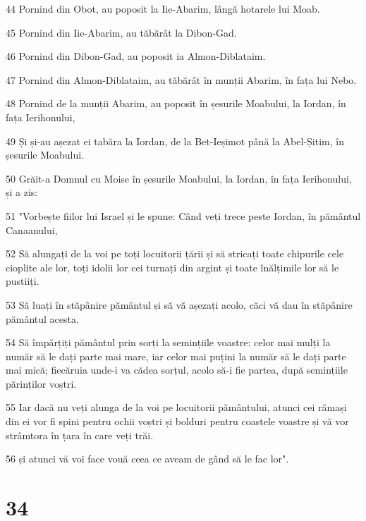 \par 44 Pornind din Obot, au poposit la Iie-Abarim, lângă hotarele lui Moab.
\par 45 Pornind din Iie-Abarim, au tăbărât la Dibon-Gad.
\par 46 Pornind din Dibon-Gad, au poposit ia Almon-Diblataim.
\par 47 Pornind din Almon-Diblataim, au tăbărât în munții Abarim, în fața lui Nebo.
\par 48 Pornind de la munții Abarim, au poposit în șesurile Moabului, la Iordan, în fața Ierihonului,
\par 49 Și și-au așezat ei tabăra la Iordan, de la Bet-Ieșimot până la Abel-Șitim, în șesurile Moabului.
\par 50 Grăit-a Domnul cu Moise în șesurile Moabului, la Iordan, în fața Ierihonului, și a zis:
\par 51 "Vorbește fiilor lui Israel și le spune: Când veți trece peste Iordan, în pământul Canaanului,
\par 52 Să alungați de la voi pe toți locuitorii țării și să stricați toate chipurile cele cioplite ale lor, toți idolii lor cei turnați din argint și toate înălțimile lor să le pustiiți.
\par 53 Să luați în stăpânire pământul și să vă așezați acolo, căci vă dau în stăpânire pământul acesta.
\par 54 Să împărțiți pământul prin sorți la semințiile voastre: celor mai mulți la număr să le dați parte mai mare, iar celor mai puțini la număr să le dați parte mai mică; fiecăruia unde-i va cădea sorțul, acolo să-i fie partea, după semințiile părinților voștri.
\par 55 Iar dacă nu veți alunga de la voi pe locuitorii pământului, atunci cei rămași din ei vor fi spini pentru ochii voștri și bolduri pentru coastele voastre și vă vor strâmtora în țara în care veți trăi.
\par 56 și atunci vă voi face vouă ceea ce aveam de gând să le fac lor".

\chapter{34}

